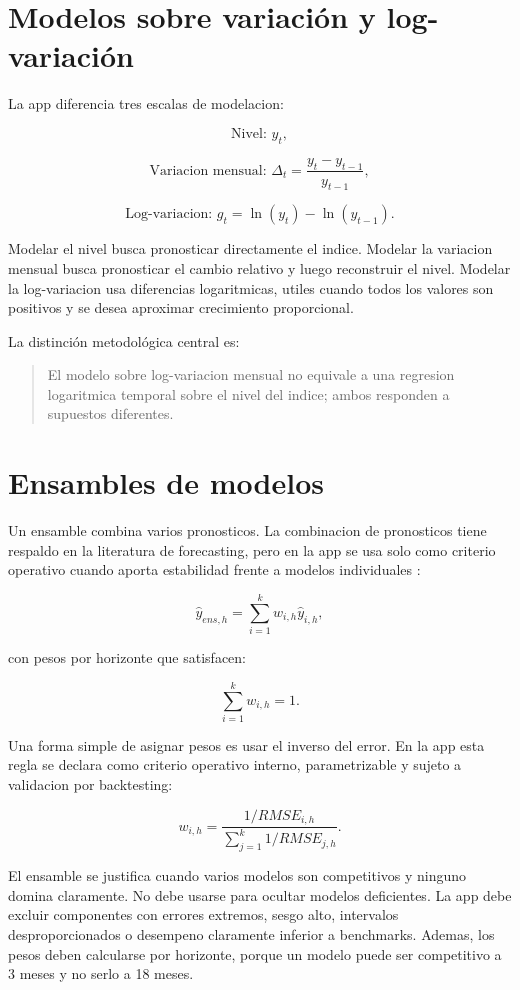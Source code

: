 ﻿\documentclass[12pt,letterpaper]{article}
\newcommand{\yhat}{\hat{y}}
\begin{document}
\section{Modelos sobre variación y log-variación}

La app diferencia tres escalas de modelacion:

\[
\text{Nivel: } y_t,
\]

\[
\text{Variacion mensual: } \Delta_t=\frac{y_t-y_{t-1}}{y_{t-1}},
\]

\[
\text{Log-variacion: } g_t=\ln(y_t)-\ln(y_{t-1}).
\]

Modelar el nivel busca pronosticar directamente el indice. Modelar la variacion mensual busca pronosticar el cambio relativo y luego reconstruir el nivel. Modelar la log-variacion usa diferencias logaritmicas, utiles cuando todos los valores son positivos y se desea aproximar crecimiento proporcional.

La distinción metodológica central es:

\begin{quote}
El modelo sobre log-variacion mensual no equivale a una regresion logaritmica temporal sobre el nivel del indice; ambos responden a supuestos diferentes.
\end{quote}

\section{Ensambles de modelos}

Un ensamble combina varios pronosticos. La combinacion de pronosticos tiene respaldo en la literatura de forecasting, pero en la app se usa solo como criterio operativo cuando aporta estabilidad frente a modelos individuales \citep{hyndman2021fpp3}:

\[
\yhat_{ens,h}=\sum_{i=1}^{k}w_{i,h}\yhat_{i,h},
\]

con pesos por horizonte que satisfacen:

\[
\sum_{i=1}^{k}w_{i,h}=1.
\]

Una forma simple de asignar pesos es usar el inverso del error. En la app esta regla se declara como criterio operativo interno, parametrizable y sujeto a validacion por backtesting:

\[
w_{i,h}=\frac{1/RMSE_{i,h}}{\sum_{j=1}^{k}1/RMSE_{j,h}}.
\]

El ensamble se justifica cuando varios modelos son competitivos y ninguno domina claramente. No debe usarse para ocultar modelos deficientes. La app debe excluir componentes con errores extremos, sesgo alto, intervalos desproporcionados o desempeno claramente inferior a benchmarks. Ademas, los pesos deben calcularse por horizonte, porque un modelo puede ser competitivo a 3 meses y no serlo a 18 meses.
\end{document}
